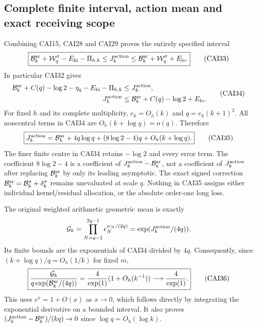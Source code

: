 \subsection{Complete finite interval, action mean and exact receiving scope}

Combining CAI15, CAI28 and CAI29 proves the entirely specified interval
\[
 \boxed{\mathcal B_k^{\rm ar}+\mathcal W_q^\sigma-E_{\rm hi}-\Pi_{h,k}
       \le J_k^{\rm action}
       \le\mathcal B_k^{\rm ar}+\mathcal W_q^\sigma+E_{\rm lo}.}
 \tag{CAI33}
\]
In particular CAI32 gives
\[
\begin{aligned}
 \mathcal B_k^{\rm ar}+C(q)-\log2-\eta_q-E_{\rm hi}-\Pi_{h,k}
     &\le J_k^{\rm action},\\
 J_k^{\rm action}&\le\mathcal B_k^{\rm ar}+C(q)-\log2+E_{\rm lo}.
\end{aligned}\tag{CAI34}
\]
For fixed $h$ and its complete multiplicity, $e_k=O_h(k)$ and
$q=e_k(k+1)^2$. All noncentral terms in CAI34 are
$O_h(k+\log q)=o(q)$. Therefore
\[
 \boxed{J_k^{\rm action}=\mathcal B_k^{\rm ar}
     +4q\log q+(8\log2-4)q+O_h(k+\log q).}\tag{CAI35}
\]
The finer finite centre in CAI34 retains $-\log2$ and every error term.
The coefficient $8\log2-4$ is a coefficient of
$J_k^{\rm action}-\mathcal B_k^{\rm ar}$, not a coefficient of
$J_k^{\rm action}$ after replacing $\mathcal B_k^{\rm ar}$ by only its
leading asymptotic. The exact signed correction
$\mathcal B_k^{\rm ar}=\mathcal B_k^\sigma+\delta_k^\sigma$ remains
unevaluated at scale $q$. Nothing in CAI35 assigns either individual
kernel/residual allocation, or the absolute order-one long loss.

The original weighted arithmetic geometric mean is exactly
\[
 \mathcal G_k=\prod_{N=q-1}^{2q-1}\epsilon_N^{w_N/(2q)}
             =\exp(J_k^{\rm action}/(4q)).
\]
Its finite bounds are the exponentials of CAI34 divided by $4q$.
Consequently, since $(k+\log q)/q=O_h(1/k)$ for fixed $m$,
\[
 \boxed{\frac{\mathcal G_k}{q\exp(\mathcal B_k^{\rm ar}/(4q))}
          =\frac4{\exp(1)}(1+O_h(k^{-1}))\longrightarrow\frac4{\exp(1)}.}
 \tag{CAI36}
\]
This uses $e^x=1+O(x)$ as $x\to0$, which follows directly by integrating
the exponential derivative on a bounded interval. It also proves
$(J_k^{\rm action}-\mathcal B_k^{\rm ar})/(kq)\to0$ since
$\log q=O_h(\log k)$.

